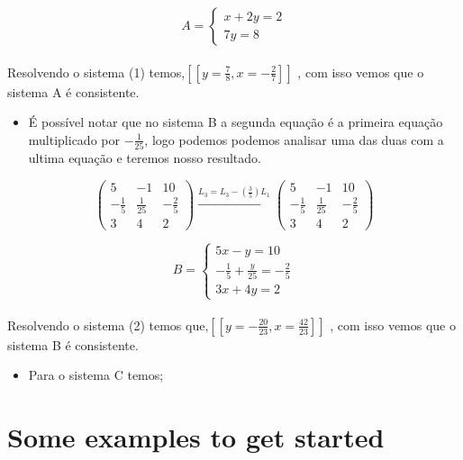 \documentclass{article}
\begin{document}
      \begin{equation}
      A = \left\{\begin{matrix} x+2y=2\\  7y=8 \end{matrix}\right.
      \end{equation}
      \\
      Resolvendo o sistema (1) temos,$\left [ \left [ y=\frac{7}{8}  , x=-\frac{2}{7}  \right ] \right ]$ , com isso vemos que o sistema A é consistente.
      \begin{itemize}
          \item É possível notar que no sistema B a segunda equação é a primeira equação multiplicado por $ -\frac{1}{25}$, logo podemos podemos analisar uma das duas com a ultima equação e teremos nosso resultado. \bigskip
          
      \end{itemize}
      \begin{equation*}
      \begin{pmatrix} 5 &-1  &10 \\-\frac{1}{5}& \frac{1}{25} & -\frac{2}{5} \\ 3 & 4 & 2 \end{pmatrix}
      \xrightarrow[]{L_3=L_3-(\frac{3}{5})L_1}
      \begin{pmatrix} 5 &-1  &10 \\-\frac{1}{5}& \frac{1}{25} & -\frac{2}{5} \\ 3 & 4 & 2 \end{pmatrix}
      \end{equation*}
      
      \begin{equation}
        B = \left\{\begin{matrix} 5x - y = 10 \\ -\frac{1}{5} + \frac{y}{25} = -\frac{2}{5} \\ 3x+4y=2 \end{matrix}\right.
      \end{equation}
       \\ 
       Resolvendo o sistema (2) temos que,$\left [ \left [ y=-\frac{20}{23}  , x=\frac{42}{23}  \right ] \right ]$ , com isso vemos que o sistema B é consistente.
      \begin{itemize}
          \item Para o sistema C temos;
      \end{itemize}
 

\section{Some examples to get started}
\end{document}
